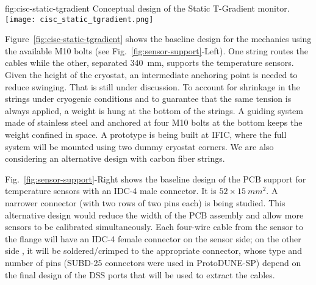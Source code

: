 \begin{dunefigure}
{fig:cisc-static-tgradient}
  {Conceptual design of the Static T-Gradient monitor.}
  \texttt{[image: cisc\_static\_tgradient.png]}
\end{dunefigure}

Figure~\ref{fig:cisc-static-tgradient} shows the baseline design for the mechanics 
using the available M10 bolts (see Fig.~\ref{fig:sensor-support}-Left). One string routes the cables while the other,
separated \SI{340}{mm},  supports the temperature sensors.
Given the height of the cryostat, an intermediate anchoring point is needed to reduce swinging. That is still under discussion. To account for shrinkage in the strings under cryogenic conditions and to guarantee that the same tension is always applied, a weight is hung at the bottom of the strings. A guiding system made of stainless steel and anchored at four M10 bolts at the bottom keeps the weight confined in space. A prototype is being built at IFIC, where the full system will be mounted using two dummy cryostat corners. We are also considering an alternative design with carbon fiber strings.  


Fig.~\ref{fig:sensor-support}-Right shows the baseline design of the
PCB support for temperature sensors with an IDC-4 male connector. 
It is $52\times \SI{15}{mm^2}$. A narrower connector (with two rows of two pins each) is being studied. This alternative design would reduce the width of the PCB assembly and allow more sensors to be calibrated simultaneously. Each four-wire cable from the sensor to the flange will have an IDC-4 female connector on the sensor side; on the other side  , it will be soldered/crimped to the appropriate connector, whose type and number of pins (SUBD-25 connectors were used in ProtoDUNE-SP) depend on the final design of the DSS ports that will be used to extract the cables. 

